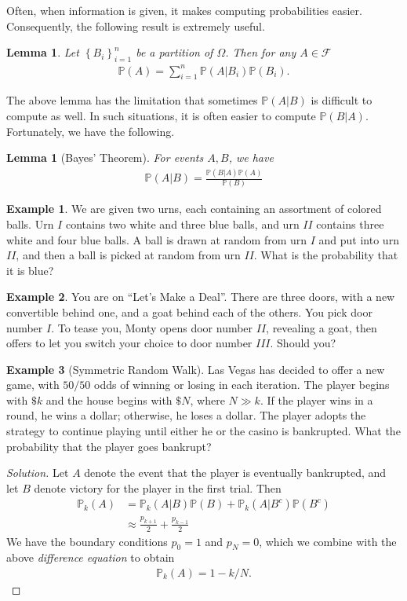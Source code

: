 \documentclass[12pt]{article}
\newcommand{\dollar}{\$}
\newcommand{\filter}{\mathcal{F}}
\newcommand{\prob}{\mathbb{P}}
\theoremstyle{plain}
\newtheorem{lemma}[theorem]{Lemma}
\theoremstyle{definition}
\newtheorem*{example}{Example}
\theoremstyle{remark}
\numberwithin{equation}{section}  %
\begin{document}
Often, when information is given, it makes computing probabilities easier.
Consequently, the following result is extremely useful.
\begin{lemma}
Let $ \left\{ B_i \right\}_{i=1}^n$ be a partition of $\Omega$. Then
for any $A \in \filter$
\begin{align*}
\prob(A) = \sum_{i = 1}^n \prob(A | B_i) \prob(B_i).
\end{align*}
\end{lemma}
The above lemma has the limitation that sometimes $\prob(A |
B)$ is difficult to compute as well. In such situations, 
it is often easier to compute $\prob(B | A)$. Fortunately, we have the
following.
\begin{lemma}[Bayes' Theorem] For events $A, B$, we have
\begin{align*}
\prob(A | B) = \frac{\prob(B | A) \prob (A)}{\prob(B)}
\end{align*}
\end{lemma}
\begin{example}
We are given two urns, each containing an assortment of colored balls.
Urn $I$ contains two white and three blue balls, and urn $II$ contains
three white and four blue balls. A ball is drawn at random from urn $I$
and put into urn $II$, and then a ball is picked at random from urn $II$.
What is the probability that it is blue?
\end{example}
\begin{example}
You are on ``Let's Make a Deal''. There are three doors, with a new convertible
behind one, and a goat behind each of the others. You pick door number $I$.
To tease you, Monty opens door number $II$, revealing a goat, then offers to let
you switch your choice to door number $III$. Should you?
\end{example}
\begin{example}[Symmetric Random Walk]
Las Vegas has decided to offer a new game, with $50/50$ odds
of winning or losing in each iteration. The player begins with $\dollar k$
and the house begins with $ \dollar N$, where $N \gg k$. If the player wins in
a round, he wins a dollar; otherwise, he loses a dollar. The player adopts the strategy
to continue playing until either he or the casino is bankrupted.
What the probability that the player goes bankrupt?
\end{example}
\begin{proof}[Solution]
Let $A$ denote the event that the player is eventually bankrupted,
and let $B$ denote victory for the player in the first trial.
Then
\begin{align*}
\prob_k(A)
& = \prob_k(A | B) \prob(B) + \prob_k(A | B^c) \prob(B^c)
\\
& \approx \frac{p_{k+1}}{2} + \frac{p_{k-1}}{2}
\end{align*}
We have the boundary conditions $p_0 = 1$ and $p_N = 0$, which we combine with
the above \emph{difference equation} to obtain
\begin{align*}
\prob_k(A) = 1 - k/N.
\end{align*}
\end{proof}
\end{document}
